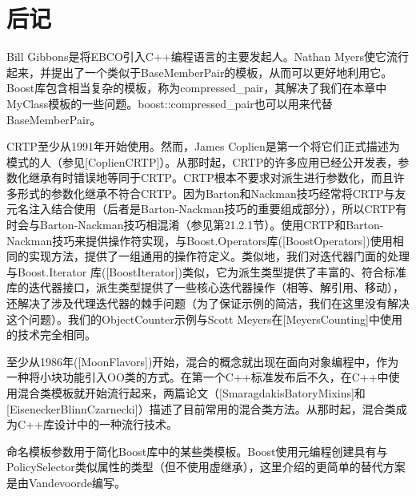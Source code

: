 \section{后记}
Bill Gibbons是将EBCO引入C++编程语言的主要发起人。Nathan Myers使它流行起来，并提出了一个类似于BaseMemberPair的模板，从而可以更好地利用它。Boost库包含相当复杂的模板，称为compressed\_pair，其解决了我们在本章中MyClass模板的一些问题。boost::compressed\_pair也可以用来代替BaseMemberPair。

CRTP至少从1991年开始使用。然而，James Coplien是第一个将它们正式描述为模式的人（参见[CoplienCRTP]）。从那时起，CRTP的许多应用已经公开发表，参数化继承有时错误地等同于CRTP。CRTP根本不要求对派生进行参数化，而且许多形式的参数化继承不符合CRTP。因为Barton和Nackman技巧经常将CRTP与友元名注入结合使用（后者是Barton-Nackman技巧的重要组成部分），所以CRTP有时会与Barton-Nackman技巧相混淆（参见第21.2.1节）。使用CRTP和Barton-Nackman技巧来提供操作符实现，与Boost.Operators库([BoostOperators])使用相同的实现方法，提供了一组通用的操作符定义。类似地，我们对迭代器门面的处理与Boost.Iterator 库([BoostIterator])类似，它为派生类型提供了丰富的、符合标准库的迭代器接口，派生类型提供了一些核心迭代器操作（相等、解引用、移动），还解决了涉及代理迭代器的棘手问题（为了保证示例的简洁，我们在这里没有解决这个问题）。我们的ObjectCounter示例与Scott Meyers在[MeyersCounting]中使用的技术完全相同。

至少从1986年([MoonFlavors])开始，混合的概念就出现在面向对象编程中，作为一种将小块功能引入OO类的方式。在第一个C++标准发布后不久，在C++中使用混合类模板就开始流行起来，两篇论文（[SmaragdakisBatoryMixins]和[EiseneckerBlinnCzarnecki]）描述了目前常用的混合类方法。从那时起，混合类成为C++库设计中的一种流行技术。

命名模板参数用于简化Boost库中的某些类模板。Boost使用元编程创建具有与PolicySelector类似属性的类型（但不使用虚继承），这里介绍的更简单的替代方案是由Vandevoorde编写。